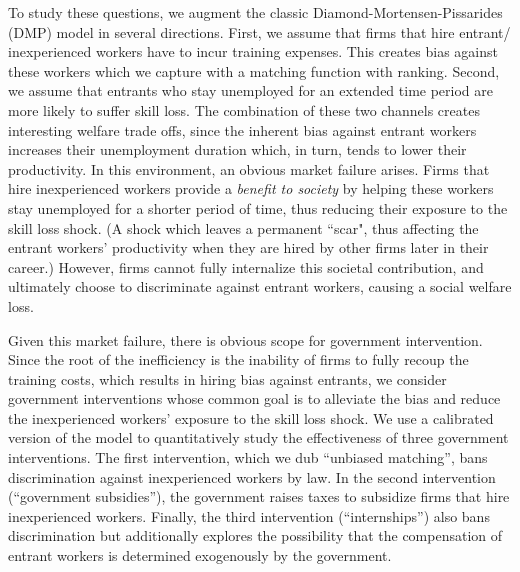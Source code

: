 \documentclass[12pt]{article} %
\theoremstyle{definition}
\begin{document}

To study these questions, we augment the classic Diamond-Mortensen-Pissarides (DMP) model in several directions. First, we assume that firms that hire entrant/ inexperienced workers have to incur training expenses. This creates bias against these workers which we capture with a \cite{blanchard1994ranking} matching function with ranking. Second, we assume that entrants who stay unemployed for an extended time period are more likely to suffer skill loss. The combination of these two channels creates interesting welfare trade offs, since the inherent bias against entrant workers increases their unemployment duration which, in turn, tends to lower their productivity. In this environment, an obvious market failure arises. Firms that hire inexperienced workers provide a \textit{benefit to society} by helping these workers stay unemployed for a shorter period of time, thus reducing their exposure to the skill loss shock. (A shock which leaves a permanent ``scar", thus affecting the entrant workers' productivity when they are hired by other firms later in their career.) However, firms cannot fully internalize this societal contribution, and ultimately choose to discriminate against entrant workers, causing a social welfare loss.  


Given this market failure, there is obvious scope for government intervention.
Since the root of the inefficiency is the inability of firms to fully recoup the training costs, which results in hiring bias against entrants, we consider government interventions whose common goal is to alleviate the bias and reduce the inexperienced workers' exposure to the skill loss shock. 
We use a calibrated version of the model to quantitatively study the effectiveness of three government interventions.
The first intervention, which we dub ``unbiased matching'', bans discrimination against inexperienced workers by law.
In the second intervention (``government subsidies''), the government raises taxes to subsidize firms that hire inexperienced workers.
Finally, the third intervention (``internships'') also bans discrimination but additionally explores the possibility that the compensation of entrant workers is determined exogenously by the government.
\end{document}
